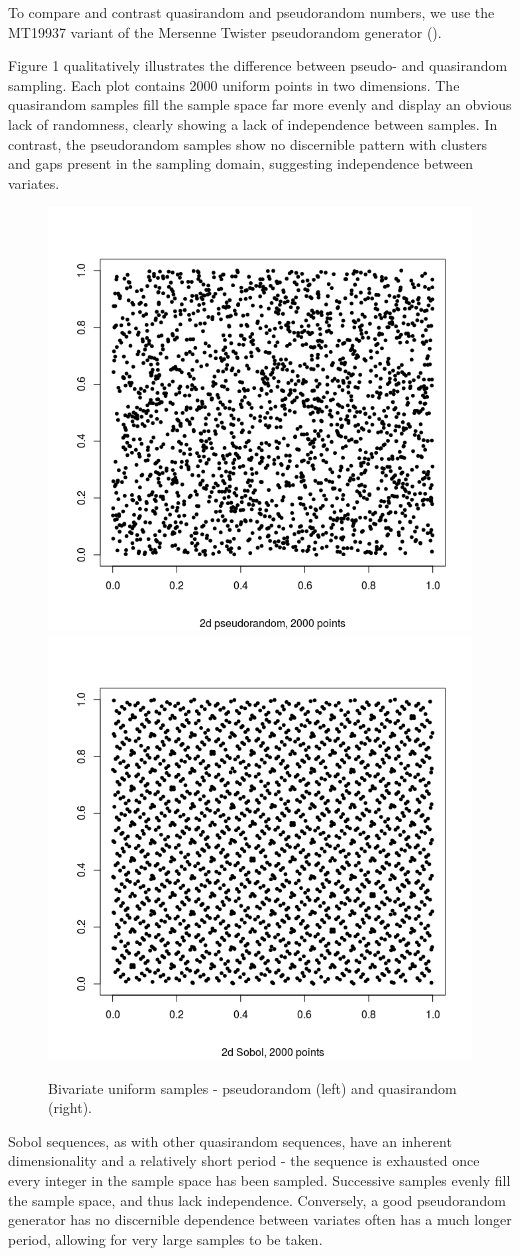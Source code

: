 \documentclass{JASSS}
\begin{document}
To compare and contrast quasirandom and pseudorandom numbers, we use the MT19937 variant of the Mersenne Twister pseudorandom generator (\cite{matsumoto_mersenne_1998}).

Figure 1 qualitatively illustrates the difference between pseudo- and
quasirandom sampling. Each plot contains 2000 uniform points in two
dimensions. The quasirandom samples fill the sample space far more
evenly and display an obvious lack of randomness, clearly showing a lack
of independence between samples. In contrast, the pseudorandom samples
show no discernible pattern with clusters and gaps present in the
sampling domain, suggesting independence between variates.

\begin{figure}[!t]
\includegraphics[width=0.5\linewidth]{figures/pseudo2d} 
\includegraphics[width=0.5\linewidth]{figures/quasi2d} 
\caption{Bivariate uniform samples -  pseudorandom (left) and quasirandom (right).}
\label{fig:unnamed-chunk-1}
\end{figure}

Sobol sequences, as with other quasirandom sequences, have an inherent
dimensionality and a relatively short period - the sequence is exhausted
once every integer in the sample space has been sampled. Successive
samples evenly fill the sample space, and thus lack independence.
Conversely, a good pseudorandom generator has no discernible dependence
between variates often has a much longer period, allowing for very large
samples to be taken.
\end{document}
